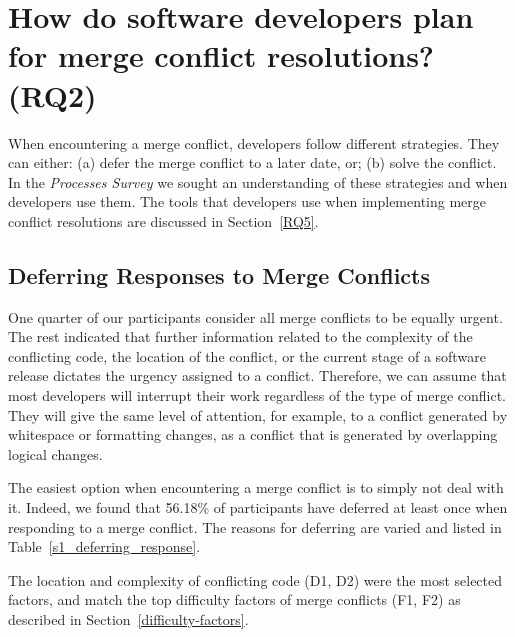 
\section{How do software developers \textbf{plan} for merge conflict resolutions? (RQ2)}\label{RQ2}

When encountering a merge conflict, developers follow different strategies.
They can either: (a) defer the merge conflict to a later date, or; (b) solve the conflict.
In the \textit{Processes Survey} we sought an understanding of these strategies and when developers use them.
The tools that developers use when implementing merge conflict resolutions are discussed in Section~\ref{RQ5}.

\subsection{Deferring Responses to Merge Conflicts}

One quarter of our participants consider all merge conflicts to be equally urgent.
The rest indicated that further information related to the complexity of the conflicting code, the location of the conflict, or the current stage of a software release dictates the urgency assigned to a conflict.
Therefore, we can assume that most developers will interrupt their work regardless of the type of merge conflict.
They will give the same level of attention, for example, to a conflict generated by whitespace or formatting changes, as a conflict that is generated by overlapping logical changes.

The easiest option when encountering a merge conflict is to simply not deal with it.
Indeed, we found that 56.18\% of participants have deferred at least once when responding to a merge conflict.
The reasons for deferring are varied and listed in Table~\ref{s1_deferring_response}.

The location and complexity of conflicting code (D1, D2) were the most selected factors, and match the top difficulty factors of merge conflicts (F1, F2) as described in Section~\ref{difficulty-factors}.

